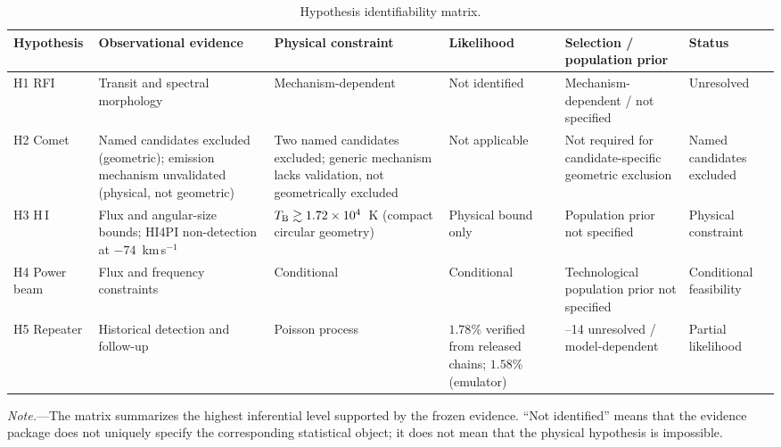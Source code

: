 \documentclass[crop]{CSL}
\newcommand{\tbeq}{T_{\rm B}}
\begin{document}
\begin{table}[htbp]
\centering
\caption{Hypothesis identifiability matrix.}
\label{tab:identifiability}
\small
\setlength{\tabcolsep}{3pt}
\renewcommand{\arraystretch}{1.2}
\begin{tabular}{
    @{}
    >{\raggedright\arraybackslash}p{}
    >{\raggedright\arraybackslash}p{}
    >{\raggedright\arraybackslash}p{}
    >{\raggedright\arraybackslash}p{}
    >{\raggedright\arraybackslash}p{}
    >{\raggedright\arraybackslash}p{}
    @{}
}
\toprule
\textbf{Hypothesis} &
\textbf{Observational evidence} &
\textbf{Physical constraint} &
\textbf{Likelihood} &
\textbf{Selection / population prior} &
\textbf{Status} \\
\midrule
H1 RFI
& Transit and spectral morphology
& Mechanism-dependent
& Not identified
& Mechanism-dependent / not specified
& Unresolved
\\
H2 Comet
& Named candidates excluded (geometric); emission mechanism unvalidated (physical, not geometric)
& Two named candidates excluded; generic mechanism lacks validation, not geometrically excluded
& Not applicable
& Not required for candidate-specific geometric exclusion
& Named candidates excluded
\\
H3 H\,I
& Flux and angular-size bounds; HI4PI non-detection at $-74$~km\,s$^{-1}$
& $\tbeq \gtrsim 1.72\times10^4$~K (compact circular geometry)
& Physical bound only
& Population prior not specified
& Physical constraint
\\
H4 Power beam
& Flux and frequency constraints
& Conditional
& Conditional
& Technological population prior not specified
& Conditional feasibility
\\
H5 Repeater
& Historical detection and follow-up
& Poisson process
& $1.78\%$ verified from released chains; $1.58\%$ (emulator)
& 2010--14 unresolved / model-dependent
& Partial likelihood
\\
\bottomrule
\end{tabular}

\vspace{3pt}
\begin{minipage}{0.98\textwidth}
\footnotesize
\textit{Note.}---The matrix summarizes the highest inferential level
supported by the frozen evidence. ``Not identified'' means that the
evidence package does not uniquely specify the corresponding
statistical object; it does not mean that the physical hypothesis is
impossible.
\end{minipage}
\end{table}
\end{document}
